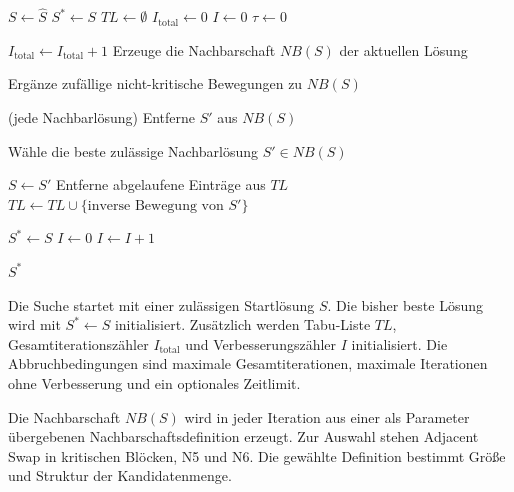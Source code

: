\begin{algorithm}[H]
    \caption{Tabu Search für das Job-Shop-Scheduling-Problem mit sequenzabhängigen Rüstzeiten}
    \label{alg:tabu_search}

    \begin{algorithmic}[1]

        \State $S \gets \hat{S}$
        \State $S^\ast \gets S$
        \State $TL \gets \emptyset$
        \State $I_{\text{total}} \gets 0$
        \State $I \gets 0$
        \State $\tau \gets 0$

        \State $I_{\text{total}} \gets I_{\text{total}} + 1$
        \State Erzeuge die Nachbarschaft $NB(S)$ der aktuellen Lösung

        \State Ergänze zufällige nicht-kritische Bewegungen zu $NB(S)$
        \EndIf

         (jede Nachbarlösung)
        \State Entferne $S'$ aus $NB(S)$
        \EndIf
        \EndFor

        \State Wähle die beste zulässige Nachbarlösung $S' \in NB(S)$

        \State $S \gets S'$
        \State Entferne abgelaufene Einträge aus $TL$
        \State $TL \gets TL \cup \{\text{inverse Bewegung von } S'\}$

        \State $S^\ast \gets S$
        \State $I \gets 0$
        \Else
        \State $I \gets I + 1$
        \EndIf
        \EndWhile

        \State \Return $S^\ast$

    \end{algorithmic}
\end{algorithm}


Die Suche startet mit einer zulässigen Startlösung $S$.
Die bisher beste Lösung wird mit $S^\ast \gets S$ initialisiert.
Zusätzlich werden Tabu-Liste $TL$, Gesamtiterationszähler $I_{\text{total}}$ und Verbesserungszähler $I$ initialisiert.
Die Abbruchbedingungen sind maximale Gesamtiterationen, maximale Iterationen ohne Verbesserung und ein optionales Zeitlimit.

Die Nachbarschaft $NB(S)$ wird in jeder Iteration aus einer als Parameter übergebenen Nachbarschaftsdefinition erzeugt.
Zur Auswahl stehen Adjacent Swap in kritischen Blöcken, N5 und N6.
Die gewählte Definition bestimmt Größe und Struktur der Kandidatenmenge.

